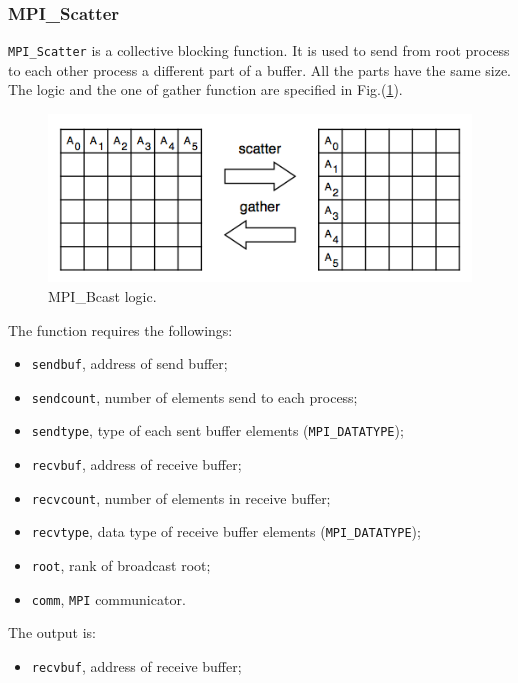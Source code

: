 \subsubsection{MPI\_Scatter}\label{subsubsection:scatter}
\verb|MPI_Scatter| is a collective blocking function. It is used to send from root process to each other process a different part of a buffer. All the parts have the same size. The logic and the one of gather function are specified in Fig.(\ref{fig:scatter_gather}).
\begin{figure}
\centering
\includegraphics[scale=.45]{images/scatter_gather.png}
\caption{MPI\_Bcast logic.}
\label{fig:scatter_gather}
\end{figure}

The function requires the followings:

\begin{itemize}
\item \verb|sendbuf|, address of send buffer;
\item \verb|sendcount|, number of elements send to each process;
\item \verb|sendtype|, type of each sent buffer elements (\verb|MPI_DATATYPE|);
\item \verb|recvbuf|, address of receive buffer;
\item \verb|recvcount|, number of elements in receive buffer;
\item \verb|recvtype|, data type of receive buffer elements (\verb|MPI_DATATYPE|);
\item \verb|root|, rank of broadcast root;
\item \verb|comm|, \verb|MPI| communicator.
\end{itemize}

The output is:

\begin{itemize}
\item \verb|recvbuf|, address of receive buffer;
\end{itemize}

